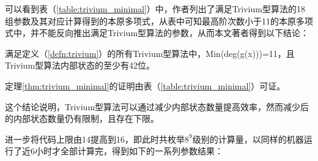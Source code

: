 可以看到表（\ref{table:trivium_minimal}）中，作者列出了满足Trivium型算法的18组参数及其对应计算得到的本原多项式，从表中可知最高阶次数小于11的本原多项式中，并不能反向推出满足Trivium型算法的参数，从而本文著者得到以下结论：
\begin{thm}[Trivium型算法对应的本原多项式最高次数最小为11]
\label{thm:trivium_minimal}
满足定义（\ref{defn:trivium}）的所有Trivium型算法中，Min(deg(g(x)))=11，且Trivium型算法内部状态的至少有42位。

定理\ref{thm:trivium_minimal}的证明由表（\ref{table:trivium_minimal}）可证。
\end{thm}

这个结论说明，Trivium型算法可以通过减少内部状态数量提高效率，然而减少后的内部状态数量仍有限制，且存在下限。

进一步将代码上限由14提高到16，即此时共枚举$8^9$级别的计算量，以同样的机器运行了近6小时才全部计算完，得到如下的一系列参数结果：

